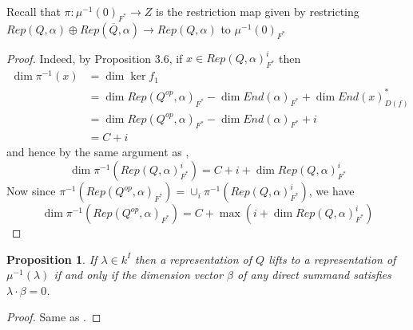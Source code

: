 \documentclass[12pt]{amsart}
\theoremstyle{plain}
\newtheorem{prop}[thm]{Proposition}
\theoremstyle{definition}
\theoremstyle{remark}
\begin{document}
Recall that $\pi:\mu^{-1}(0)_{F^*}\to Z$ is the restriction map given by restricting $Rep(Q,\alpha)\oplus Rep(\overline{Q},\alpha)\to Rep(Q,\alpha)$ to $\mu^{-1}(0)_{F^*}$
\begin{proof}
\selectfont
Indeed, by Proposition 3.6, if $x\in Rep(Q,\alpha)_{F^*}^i$ then \begin{align*}
    \dim\pi^{-1}(x)&=\dim \operatorname{ker}f_1\\
    &=\dim Rep(Q^{op},\alpha)_{F^*}-\dim End(\alpha)_{F^*}+\dim End(x)^*_{D(f)}\\
    &=\dim Rep(Q^{op},\alpha)_{F^*}-\dim End(\alpha)_{F^*}+i\\
    &=C+i
\end{align*}
and hence by the same argument as \cite[Lemma 3.4]{crawley2001geometry},
$$\dim\pi^{-1}(Rep(Q,\alpha)^i_{F^*})=C+i+\dim Rep(Q,\alpha)_{F^*}^i$$
Now since $\pi^{-1}(Rep(Q^{op},\alpha)_{F^*})=\cup_i\pi^{-1}(Rep(Q,\alpha)^i_{F^*})$, we have 
$$\dim\pi^{-1}(Rep(Q^{op},\alpha)_{F^*})=C+\max(i+\dim Rep(Q,\alpha)_{F^*}^i)$$
\end{proof}
\begin{prop} \selectfont If $\lambda\in k^I$ then a representation of $Q$ lifts to a representation of $\mu^{-1}(\lambda)$ if and only if the dimension vector $\beta$ of any direct summand satisfies $\lambda\cdot\beta=0$.
\end{prop}
\begin{proof}
\selectfont
Same as \cite[Theorem 3.3]{crawley2001geometry}.

\end{proof}
\end{document}
